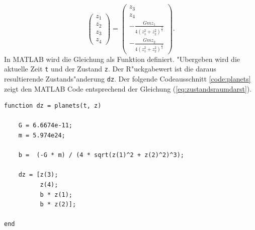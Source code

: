 \begin{refsection}
\begin{equation}
\begin{pmatrix}
z_1 \\ 
z_2 \\
z_3 \\
z_4
\end{pmatrix} = \begin{pmatrix}
z_3 \\ 
z_4 \\[1mm]
\displaystyle-\frac{G m z_1}{4(z_1^2 + z_2^2)^\frac32} \\[4mm]
\displaystyle-\frac{G m z_2}{4(z_1^2 + z_2^2)^\frac32}
\end{pmatrix}.
\end{equation}
In MATLAB wird die Gleichung als Funktion definiert.
"Ubergeben wird die aktuelle Zeit \texttt{t} und der Zustand \texttt{z}.
Der R"uckgabewert ist die daraus resultierende  Zustands"anderung \texttt{dz}.
Der folgende Codeausschnitt \ref{code:planets} zeigt den MATLAB Code entsprechend der Gleichung (\ref{eq:zustandsraumdarst}).
\begin{lstlisting}[style=MATLAB, caption={Problemfunktion}, captionpos=b, label={code:planets}]
function dz = planets(t, z)

    G = 6.6674e-11;
    m = 5.974e24;

    b =  (-G * m) / (4 * sqrt(z(1)^2 + z(2)^2)^3);
    
    dz = [z(3);
          z(4);
          b * z(1);
          b * z(2)];
      
end
\end{lstlisting}


\end{refsection}
